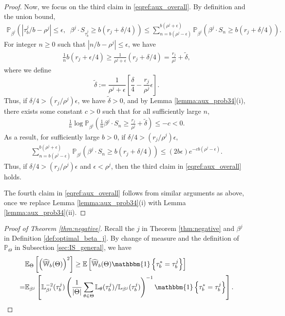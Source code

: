 \documentclass[aap,preprint]{imsart}
\newcommand{\Pro}{{\mathbb{P}}}
\newcommand{\Exp}{{\mathbb{E}}}
\theoremstyle{plain}
\theoremstyle{definition}
\begin{document}
\begin{appendix}
\begin{proof}
Now, we focus on the third claim in \eqref{eqref:aux_overall}. By definition and the union bound,
\begin{align*}
 \Pro_{\beta^j}\left(\left|{\tau_b^j}/{b} - \rho^{j}\right| \leq   \epsilon, \;\; \beta^j \cdot S_{\tau_b^j} \geq  b(r_j + \delta/4) \right) 
 \leq \sum_{n = b(\rho^j-\epsilon)}^{b(\rho^j+\epsilon)}  \Pro_{\beta^j}\left(\beta^j \cdot S_{n} \geq  b(r_j + \delta/4) \right).
\end{align*}
For integer $n \geq 0$ such that $|n/b - \rho^j| \leq \epsilon$, we have
\begin{align*}
    \frac{1}{n}  b(r_j + \epsilon/4) \geq \frac{1}{\rho^j +\epsilon} (r_j + \delta/4) = \frac{r_j}{\rho^j} + \tilde{\delta},
\end{align*}
where we define
$$
\tilde{\delta}:= \frac{1}{\rho^j + \epsilon}\left[\frac{\delta}{4} - \frac{r_j}{\rho^j} \epsilon \right].
$$
Thus, if $\delta/4 >  ({r_j}/{\rho^j}) \epsilon $, we have $\tilde{\delta} > 0$, and by Lemma \ref{lemma:aux_prob34}(i), there exists some constant $c > 0$ such that  for all sufficiently large $n$, 
\begin{align*}
           \frac{1}{n}  \log \Pro_{\beta^j}\left( \frac{1}{n}\beta^j \cdot S_n \geq \frac{r_j}{\rho^j} + \tilde{\delta}  \right) \leq -c < 0.
    \end{align*}
As a result, for sufficiently large $b > 0$, if $\delta/4 >  ({r_j}/{\rho^j}) \epsilon $,
\begin{align*}
    \sum_{n = b(\rho^j-\epsilon)}^{b(\rho^j+\epsilon)}  \Pro_{\beta^j}\left(\beta^j \cdot S_{n} \geq  b(r_j + \delta/4) \right) \leq (2b\epsilon) e^{-c b(\rho^j - \epsilon)}.
\end{align*}
Thus, if $\delta/4 >  ({r_j}/{\rho^j}) \epsilon $ and $\epsilon < \rho^j$, then the third claim in \eqref{eqref:aux_overall} holds.

The fourth claim in \eqref{eqref:aux_overall} follows from similar arguments as above, once we replace   Lemma \ref{lemma:aux_prob34}(i) with Lemma \ref{lemma:aux_prob34}(ii).
\end{proof}
 


\begin{proof}[Proof of Theorem \ref{thm:negative}]
Recall the $j$ in Theorem \ref{thm:negative} and $\beta^j$ in Definition \ref{def:optimal_beta_j}. By change of measure and the definition of $\Pro_{\Theta}$ in Subsection \ref{sec:IS_general}, we have
\begin{align*}
&\Exp_{\Theta}\left[ \left(\widehat{\mathbb{W}}_{b}(\Theta) \right)^2  \right] 
\geq \Exp\left[ \widehat{\mathbb{W}}_{b}(\Theta)  \mathbbm{1}\left\{\tau_b^* = \tau_b^j\right\}\right] \\
= & \Exp_{\beta^j}\left[
\mathbb{L}_{\beta^j}^{-2}(\tau_b^j) 
   \left( \frac{1}{|\Theta|} \sum_{\theta \in \Theta} 
\mathbb{L}_{\theta}(\tau_b^j)/\mathbb{L}_{\beta^j}(\tau_b^j) \right)^{-1} 
\mathbbm{1}\left\{\tau_b^* = \tau_b^j\right\}\right].
\end{align*}


\end{proof}
\end{appendix}
\end{document}
